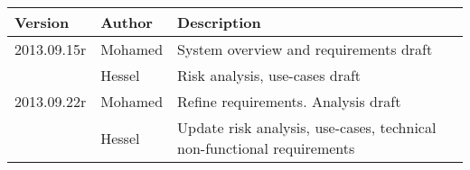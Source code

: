 
\begin{longtable}{llX}
	\toprule
	\bf Version & \bf Author & \bf Description \\
	\toprule
	\endhead
	2013.09.15r & Mohamed   & System overview and requirements draft \\
					& Hessel    & Risk analysis, use-cases draft \\
	\midrule
	2013.09.22r & Mohamed   & Refine requirements. Analysis draft \\
					& Hessel    & Update risk analysis, use-cases, technical non-functional requirements \\
	\bottomrule
\end{longtable}
